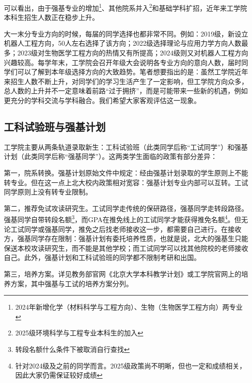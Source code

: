 \documentclass[11pt,oneside]{book}
\begin{document}
可以看出，由于强基专业的增加\footnote{2024年新增化学（材料科学与工程方向）、生物（生物医学工程方向）两专业}、其他院系并入\footnote{2025级环境科学与工程专业本科生的加入}和基础学科扩招，近年来工学院本科生招生人数正在稳步上升。

\vspace{10pt}

大一末分专业方向的时候，每届的同学选择也都非常不同。例如：2019级，新设立机器人工程方向，50人左右选择了该方向；2022级选择理论与应用力学方向人数最多；2023级对生物医学工程方向的热情又有所提高；2024级则又对机器人工程方向兴趣较高。每学年末，工学院会召开年级大会说明各专业方向的意向人数，届时同学们可以了解到本年级选择方向的大致趋势。笔者想要指出的是：虽然工学院近年来招生人数不断上升，对同学们的学习生活产生了一定影响，但工学院方向众多，总人数的上升并不一定意味着前路“过于拥挤”，而是可能带来一些新的机遇，例如更充分的学科交流与学科融合。我们希望大家客观评估这一现象。

\subsection{工科试验班与强基计划}
工学院主要从两条轨道录取新生：工科试验班（此类同学后称“工试同学”）和强基计划（此类同学后称“强基同学”）。这两类学生面临的政策有部分差异：

\vspace{10pt}

第一，院系转换。强基计划原始文件中规定：经由强基计划录取的学生原则上不能转专业。但在这一点上北大校内政策相对宽容：强基计划专业内部可以互转。工试同学原则上没有转专业限制。

\vspace{20pt}

第二，推荐免试攻读研究生。工试同学走传统的保研路径，强基同学走转段路径。强基同学自带转段名额\footnote{转段名额什么条件下被取消自行查找}，而GPA在推免线上的工试同学才能获得推免名额\footnote{针对2024级及之前的同学而言。2025级政策尚不明晰，但也一定和成绩相关，因此大家仍需保证较好成绩}。但无论工试同学或强基同学，推免之后找老师接收这一步，都需要自己进行。在接收方，强基同学存在限制：强基计划有委托培养性质，也就是说，北大的强基生只能保送本校攻读研究生，而不能是其他学校；而工试同学可以找其他院校的老师接收自己。此外，强基计划和工科试验班的同学都不限制考研和出国。

\vspace{10pt}

第三，培养方案。详见教务部官网《北京大学本科教学计划》或工学院官网上的培养方案，其中强基与工试的培养方案分列。

\vspace{10pt}
\end{document}
